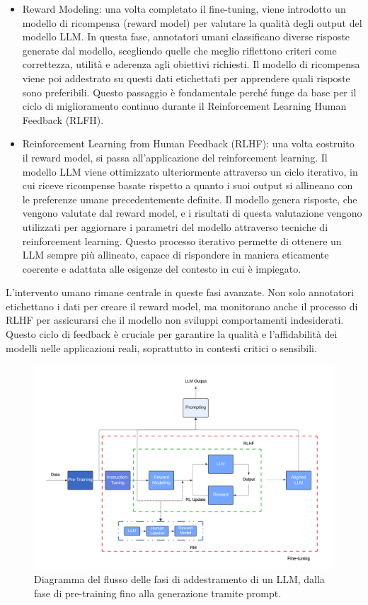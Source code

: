 \documentclass[target=mst,aauheader=,style=]{thud}
\begin{document}
\begin{itemize}
    \item Reward Modeling: una volta completato il fine-tuning, viene introdotto un modello di ricompensa (reward model) per valutare la qualità degli output del modello LLM. In questa fase, annotatori umani classificano diverse risposte generate dal modello, scegliendo quelle che meglio riflettono criteri come correttezza, utilità e aderenza agli obiettivi richiesti. Il modello di ricompensa viene poi addestrato su questi dati etichettati per apprendere quali risposte sono preferibili. Questo passaggio è fondamentale perché funge da base per il ciclo di miglioramento continuo durante il Reinforcement Learning Human Feedback (RLFH).
    \item Reinforcement Learning from Human Feedback (RLHF): una volta costruito il reward model, si passa all’applicazione del reinforcement learning. Il modello LLM viene ottimizzato ulteriormente attraverso un ciclo iterativo, in cui riceve ricompense basate rispetto a quanto i suoi output si allineano con le preferenze umane precedentemente definite. Il modello genera risposte, che vengono valutate dal reward model, e i risultati di questa valutazione vengono utilizzati per aggiornare i parametri del modello attraverso tecniche di reinforcement learning. Questo processo iterativo permette di ottenere un LLM sempre più allineato, capace di rispondere in maniera eticamente coerente e adattata alle esigenze del contesto in cui è impiegato.
\end{itemize}

L'intervento umano rimane centrale in queste fasi avanzate. Non solo annotatori etichettano i dati per creare il reward model, ma monitorano anche il processo di RLHF per assicurarsi che il modello non sviluppi comportamenti indesiderati. Questo ciclo di feedback è cruciale per garantire la qualità e l'affidabilità dei modelli nelle applicazioni reali, soprattutto in contesti critici o sensibili.

\begin{figure}[htbp]
    \centering
    \includegraphics[width=\linewidth]{immagini/pre-training-e-fine-tuning.png}
    \caption{Diagramma del flusso delle fasi di addestramento di un LLM, dalla fase di pre-training fino alla generazione tramite prompt.}
    \label{fig:example}
\end{figure}
\end{document}

